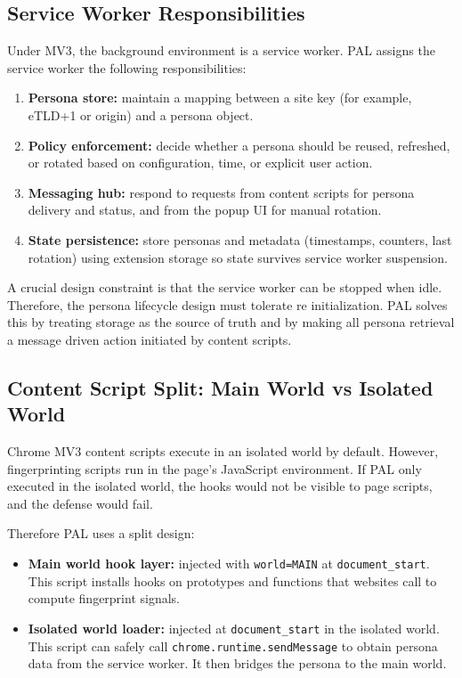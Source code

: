 \documentclass[11pt]{report}
\begin{document}
\subsection{Service Worker Responsibilities}

Under MV3, the background environment is a service worker. PAL assigns the service worker the following responsibilities:

\begin{enumerate}
    \item \textbf{Persona store:} maintain a mapping between a site key (for example, eTLD+1 or origin) and a persona object.
    \item \textbf{Policy enforcement:} decide whether a persona should be reused, refreshed, or rotated based on configuration, time, or explicit user action.
    \item \textbf{Messaging hub:} respond to requests from content scripts for persona delivery and status, and from the popup UI for manual rotation.
    \item \textbf{State persistence:} store personas and metadata (timestamps, counters, last rotation) using extension storage so state survives service worker suspension.
\end{enumerate}

A crucial design constraint is that the service worker can be stopped when idle. Therefore, the persona lifecycle design must tolerate re initialization. PAL solves this by treating storage as the source of truth and by making all persona retrieval a message driven action initiated by content scripts.

\subsection{Content Script Split: Main World vs Isolated World}

Chrome MV3 content scripts execute in an isolated world by default. However, fingerprinting scripts run in the page's JavaScript environment. If PAL only executed in the isolated world, the hooks would not be visible to page scripts, and the defense would fail.

Therefore PAL uses a split design:

\begin{itemize}
    \item \textbf{Main world hook layer:} injected with \texttt{world=MAIN} at \texttt{document\_start}. This script installs hooks on prototypes and functions that websites call to compute fingerprint signals.
    \item \textbf{Isolated world loader:} injected at \texttt{document\_start} in the isolated world. This script can safely call \texttt{chrome.runtime.sendMessage} to obtain persona data from the service worker. It then bridges the persona to the main world.
\end{itemize}
\end{document}
